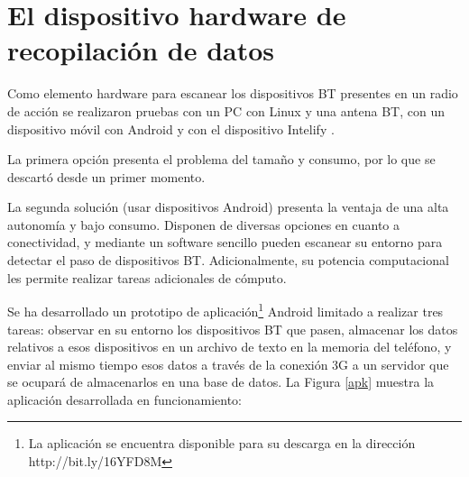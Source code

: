 \documentclass[twocolumn,twoside]{Jornadas}
\begin{document}
\section{El dispositivo hardware de recopilación de datos}
\label{hw}

Como elemento hardware para escanear los dispositivos BT presentes en un radio de acción se realizaron pruebas con un PC con Linux y una antena BT, con un dispositivo móvil con Android y con el dispositivo Intelify \cite{intelify}.

La primera opción presenta el problema del tamaño y consumo, por lo que se descartó desde un primer momento.

La segunda solución (usar dispositivos Android) presenta la ventaja de una alta autonomía y bajo consumo. Disponen de diversas opciones en cuanto a conectividad, y mediante un software sencillo pueden escanear su entorno para detectar el paso de dispositivos BT. Adicionalmente, su potencia computacional les permite realizar tareas adicionales de cómputo.

Se ha desarrollado un prototipo de aplicación\footnote{La aplicación se encuentra disponible para su descarga en la dirección http://bit.ly/16YFD8M} 
Android limitado a realizar tres tareas: observar en su entorno los dispositivos BT que pasen, almacenar los datos relativos a esos dispositivos en un archivo de texto en la memoria del teléfono, y enviar al mismo tiempo esos datos a través de la conexión 3G a un servidor que se ocupará de almacenarlos en una base de datos. 
La Figura \ref{apk} muestra la aplicación desarrollada en funcionamiento:
\end{document}
